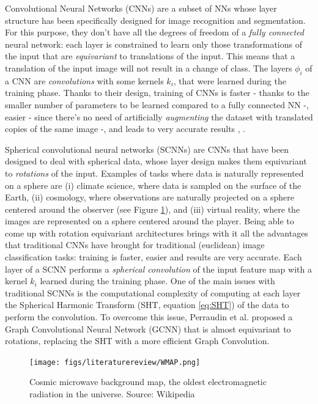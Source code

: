 Convolutional Neural Networks (CNNs) are a subset of NNs whose layer structure has been specifically designed for image recognition and segmentation. For this purpose, they don't have all the degrees of freedom of a \textit{fully connected} neural network: each layer is constrained to learn only those transformations of the input that are \textit{equivariant} to translations of the input. This means that a translation of the input image will not result in a change of class. The layers $\phi_i$ of a CNN are \textit{convolutions} with some kernels $k_i$, that were learned during the training phase. Thanks to their design, training of CNNs is faster - thanks to the smaller number of parameters to be learned compared to a fully connected NN -, easier - since there's no need of artificially \textit{augmenting} the dataset with translated copies of the same image -, and leads to very accurate results \cite{SCNN}, \cite{Esteves}.

Spherical convolutional neural networks (SCNNs) are CNNs that have been designed to deal with spherical data, whose layer design makes them equivariant to \textit{rotations} of the input.  Examples of tasks where data is naturally represented on a sphere are (i) climate science, where data is sampled on the surface of the Earth, (ii) cosmology, where observations are naturally projected on a sphere centered around the observer (see Figure \ref{fig:cosmicradiation}), and (iii) virtual reality, where the images are represented on a sphere centered around the player. Being able to come up with rotation equivariant architectures brings with it all the advantages that traditional CNNs have brought for traditional (euclidean) image classification tasks: training is faster, easier and results are very accurate. Each layer of a SCNN performs a \textit{spherical convolution} of the input feature map with a kernel $k_i$ learned during the training phase. One of the main issues with traditional SCNNs is the computational complexity of computing at each layer the Spherical Harmonic Transform (SHT, equation \ref{eq:SHT}) of the data to perform the convolution. To overcome this issue, Perraudin et al. \cite{DeepSphere} proposed a Graph Convolutional Neural Network (GCNN) that is almost equivariant to rotations, replacing the SHT with a more efficient Graph Convolution.
\begin{figure}
	\centering
	\caption{\label{fig:cosmicradiation} Cosmic microwave background map, the oldest electromagnetic radiation in the universe. Source: Wikipedia}
	\texttt{[image: figs/literaturereview/WMAP.png]}
\end{figure}

